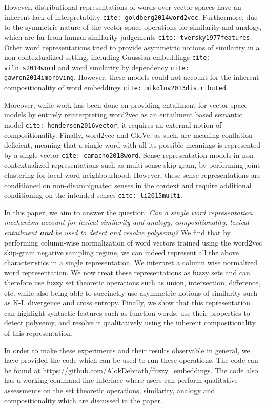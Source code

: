 \documentclass{book}
\newcommand{\citep}[1]{\texttt{cite: #1}}
\begin{document}
However, distributional representations of words over vector spaces have an
inherent lack of interpretablity \citep{goldberg2014word2vec}. Furthermore, due
to the symmetric nature of the vector space operations for similarity and
analogy, which are far from human similarity judgements
\citep{tversky1977features}. Other word representations tried to provide
asymmetric notions of similarity in a non-contextualized setting, including
Gaussian embeddings \citep{vilnis2014word} and word similarity by dependency
\citep{gawron2014improving}. However, these models could not account for the
inherent compositionality of word embeddings \citep{mikolov2013distributed}. 

Moreover, while work has been done on providing entailment for vector space
models by entirely reinterpreting word2vec as an entailment based semantic
model \citep{henderson2016vector}, it requires an external notion of
compositionality. Finally, word2vec and GloVe, as such, are meaning conflation
deficient, meaning that a single word with all its possible meanings is
represented by a single vector \citep{camacho2018word}. Sense representation
models in non-contextualized representations such as multi-sense skip gram, by
performing joint clustering for local word neighbourhood. However, these sense
representations are conditioned on non-disambiguated senses in the context and
require additional conditioning on the intended senses \citep{li2015multi}. 

In this paper, we aim to answer the question: \textit{Can a single word
representation mechanism account for lexical similarity and analogy,
compositionality, lexical entailment \textbf{and} be used to detect and resolve
polysemy?} We find that by performing column-wise normalization of word vectors
trained using the word2vec skip-gram negative sampling regime, we can indeed
represent all the above characteristics in a single representation. We
interpret a column wise normalized word representation. We now treat these
representations as fuzzy sets and can therefore use fuzzy set theoretic
operations such as union, intersection, difference, etc. while also being able
to succinctly use asymmetric notions of similarity such as K-L divergence and
cross entropy. Finally, we show that this representation can highlight
syntactic features such as function words, use their properties to detect
polysemy, and resolve it qualitatively using the inherent compositionality of
this representation.

In order to make these experiments and their results observable in general, we
have provided the code which can be used to run these operations. The code can
be found at \url{https://github.com/AlokDebnath/fuzzy_embeddings}. The code
also has a working command line interface where users can perform qualitative
assessments on the set theoretic operations, similarity, analogy and
compositionality which are discussed in the paper.
\end{document}
